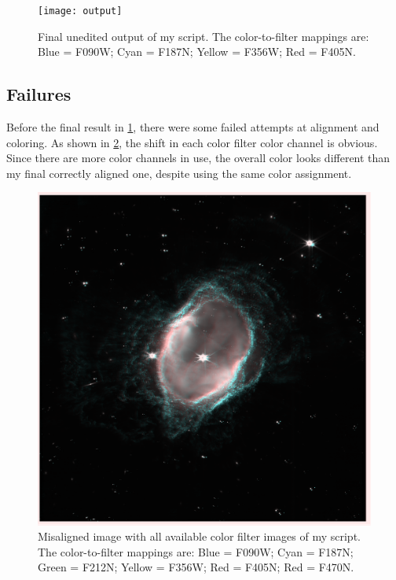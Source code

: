 \documentclass[10pt,twocolumn,letterpaper]{article}
\begin{document}
\begin{figure}[t]
  \centering
  \texttt{[image: output]}
  \caption{Final unedited output of my script. The color-to-filter mappings are: Blue = F090W; Cyan = F187N; Yellow = F356W; Red = F405N.}
  \label{fig:output}
\end{figure}

\subsection{Failures}

Before the final result in \cref{fig:output}, there were some failed attempts at alignment and coloring. As shown in \cref{fig:misaligned}, the shift in each color filter color channel is obvious. Since there are more color channels in use, the overall color looks different than my final correctly aligned one, despite using the same color assignment.

\begin{figure}[t]
  \centering
  \includegraphics[scale=0.11]{misaligned2}
  \caption{Misaligned image with all available color filter images of my script. The color-to-filter mappings are:  Blue = F090W; Cyan = F187N; Green = F212N; Yellow = F356W; Red = F405N; Red = F470N.}
  \label{fig:misaligned}
\end{figure}
\end{document}
